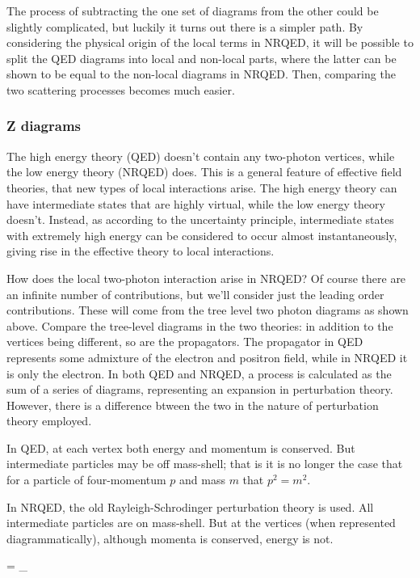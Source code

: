 The process of subtracting the one set of diagrams from the other could be slightly complicated, but luckily it turns out there is a simpler path.  By considering the physical origin of the local terms in NRQED, it will be possible to split the QED diagrams into local and non-local parts, where the latter can be shown to be equal to the non-local diagrams in NRQED.  Then, comparing the two scattering processes becomes much easier.

\subsubsection{Z diagrams}
The high energy theory (QED) doesn't contain any two-photon vertices, while the low energy theory (NRQED) does.  This is a general feature of effective field theories, that new types of local interactions arise.  The high energy theory can have intermediate states that are highly virtual, while the low energy theory doesn't.  Instead, as according to the uncertainty principle, intermediate states with extremely high energy can be considered to occur almost instantaneously, giving rise in the effective theory to local interactions.

How does the local two-photon interaction arise in NRQED?  Of course there are an infinite number of contributions, but we'll consider just the leading order contributions.  These will come from the tree level two photon diagrams as shown above.  Compare the tree-level diagrams in the two theories: in addition to the vertices being different, so are the propagators.  The propagator in QED represents some admixture of the electron and positron field, while in NRQED it is only the electron.
In both QED and NRQED, a process is calculated as the sum of a series of diagrams, representing an expansion in perturbation theory.  However, there is a difference btween the two in the nature of perturbation theory employed.

In QED, at each vertex both energy and momentum is conserved.  But intermediate particles may be off mass-shell; that is it is no longer the case that for a particle of four-momentum $p$ and mass $m$ that $p^2 = m^2$.

In NRQED, the old Rayleigh-Schrodinger perturbation theory is used.   All intermediate particles are on mass-shell.  But at the vertices (when represented diagrammatically), although momenta is conserved, energy is not.  

\beq
	\Delta =  \Sigma_ 
\eeq


